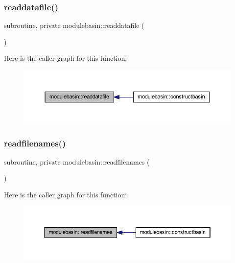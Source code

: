\subsubsection{\texorpdfstring{readdatafile()}{readdatafile()}}
{\footnotesize\ttfamily subroutine, private modulebasin\+::readdatafile (\begin{DoxyParamCaption}{ }\end{DoxyParamCaption})\hspace{0.3cm}{\ttfamily [private]}}

Here is the caller graph for this function\+:\nopagebreak
\begin{figure}[H]
\begin{center}
\leavevmode
\includegraphics[width=350pt]{namespacemodulebasin_af9f507847046c6d52d84d57c39911669_icgraph}
\end{center}
\end{figure}
\mbox{\label{namespacemodulebasin_a78bcec6c944663f5c555c4799011fd8f}} 
\subsubsection{\texorpdfstring{readfilenames()}{readfilenames()}}
{\footnotesize\ttfamily subroutine, private modulebasin\+::readfilenames (\begin{DoxyParamCaption}{ }\end{DoxyParamCaption})\hspace{0.3cm}{\ttfamily [private]}}

Here is the caller graph for this function\+:\nopagebreak
\begin{figure}[H]
\begin{center}
\leavevmode
\includegraphics[width=350pt]{namespacemodulebasin_a78bcec6c944663f5c555c4799011fd8f_icgraph}
\end{center}
\end{figure}
\mbox{\label{namespacemodulebasin_a4ea226fec981510a8e050dbe3bc285ab}} 
